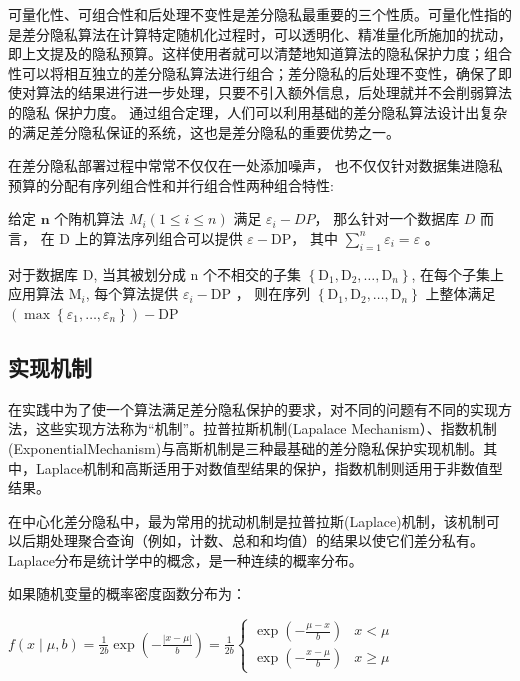 可量化性、可组合性和后处理不变性是差分隐私最重要的三个性质。可量化性指的是差分隐私算法在计算特定随机化过程时，可以透明化、精准量化所施加的扰动，即上文提及的隐私预算。这样使用者就可以清楚地知道算法的隐私保护力度；组合性可以将相互独立的差分隐私算法进行组合；差分隐私的后处理不变性，确保了即使对算法的结果进行进一步处理，只要不引入额外信息，后处理就并不会削弱算法的隐私
保护力度。 通过组合定理，人们可以利用基础的差分隐私算法设计出复杂的满足差分隐私保证的系统，这也是差分隐私的重要优势之一。 

在差分隐私部署过程中常常不仅仅在一处添加噪声， 也不仅仅针对数据集进隐私预算的分配有序列组合性和并行组合性两种组合特性:

\begin{theorem}[串行组合]\label{串行组合}
给定 $\mathbf{n}$ 个陏机算法 $M_{i}(1 \leq i \leq n)$ 满足 $\varepsilon_{i}-DP$， 那么针对一个数据库 $D$ 而言， 在 $\mathrm{D}$ 上的算法序列组合可以提供 $\varepsilon-\mathrm{DP}$， 其中 $\sum_{i=1}^{n} \varepsilon_{i}=\varepsilon$ 。
\end{theorem}

\begin{theorem}[并行组合]\label{并行组合}
对于数据库 $\mathrm{D}$, 当其被划分成 $\mathrm{n}$ 个不相交的子集 $\left\{\mathrm{D}_{1}, \mathrm{D}_{2}, \ldots, \mathrm{D}_{n}\right\}$, 在每个子集上应用算法 $\mathrm{M}_{i}$, 每个算法提供 $\varepsilon_{i}-\mathrm{DP}$ ， 则在序列 $\left\{\mathrm{D}_{1}, \mathrm{D}_{2}, \ldots, \mathrm{D}_{n}\right\}$ 上整体满足 $\left(\max \left\{\varepsilon_{1}, \ldots, \varepsilon_{n}\right\}\right)-\mathrm{DP}$
\end{theorem}


\subsection{实现机制}
在实践中为了使一个算法满足差分隐私保护的要求，对不同的问题有不同的实现方法，这些实现方法称为“机制”。拉普拉斯机制(Lapalace Mechanism）、指数机制(ExponentialMechanism)与高斯机制是三种最基础的差分隐私保护实现机制。其中，Laplace机制和高斯适用于对数值型结果的保护，指数机制则适用于非数值型结果。

在中心化差分隐私中，最为常用的扰动机制是拉普拉斯(Laplace)机制，该机制可以后期处理聚合查询（例如，计数、总和和均值）的结果以使它们差分私有。
Laplace分布是统计学中的概念，是一种连续的概率分布。

\begin{theorem}[拉普拉斯机制]\label{拉普拉斯机制}
如果随机变量的概率密度函数分布为：

$f(x \mid \mu, b)=\frac{1}{2 b} \exp \left(-\frac{|x-\mu|}{b}\right)=\frac{1}{2 b}\left\{\begin{array}{ll}\exp \left(-\frac{\mu-x}{b}\right) & x<\mu \\ \exp \left(-\frac{x-\mu}{b}\right) & x \geq \mu\end{array}\right.$
\end{theorem}

